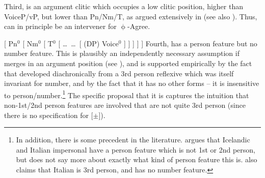 \documentclass[output=paper]{langscibook}
\begin{document}
Third, \sti is an argument clitic which occupies a low clitic position, higher than VoiceP/vP, but lower than Pn/Nm/T, as argued extensively in \citet[ch.2]{Wood2015book} (see also  \citealt{eythors:1995ab,Kissock:1997gm,SigMin,Svenonius:2005vx,Svenonius:2006zt}).  Thus, \sti can in principle be an intervener for $\upphi$-Agree. %

\ea
{ [ Pn$^0$ [ Nm$^0$ [ T$^0$ [ \dots\ \sti \dots\ [ (DP) Voice$^0$ ] ] ] ] ] }
\z
Fourth, \sti{} has a person feature but no number feature.  This is plausibly an  independently necessary assumption if \sti merges in an argument position (see \citealt{Wood2015book}), and is  supported empirically by the fact that \sti developed diachronically from a 3rd person reflexive which was itself invariant for number, and by the fact that it has no other forms -- it is insensitive to person/number.\footnote{In addition, there is some precedent in the literature. \citet{DAlessandro:2003oy} argues that Icelandic \sti and Italian impersonal  have a person feature which is not 1st or 2nd person, but does not say more about exactly what kind of person feature this is. \citet{Taraldsen:1995om} also claims that Italian  is 3rd person, and has no number feature.} The specific proposal that it is  captures the intuition that non-1st/2nd person features are involved that are not quite 3rd person (since there is no specification for [$\pm$]). 
\end{document}
